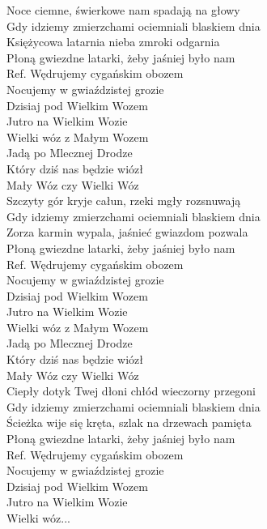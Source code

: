 
Noce ciemne, świerkowe nam spadają na głowy \\
Gdy idziemy zmierzchami ociemniali blaskiem dnia \\
Księżycowa latarnia nieba zmroki odgarnia  \tab{}\\
Płoną gwiezdne latarki, żeby jaśniej było nam  \tab{}\\
\hops
Ref. Wędrujemy cygańskim obozem \tab{}\\
 Nocujemy w gwiaździstej grozie  \tab{}\\
 Dzisiaj pod Wielkim Wozem  \tab{}\\
 Jutro na Wielkim Wozie  \tab{}\tab{}\\
\hops
{} {} Wielki wóz z Małym Wozem  \tab{}\\
 {} Jadą po Mlecznej Drodze  \tab{}\\
 {} Który dziś nas będzie wiózł  \tab{}\\
 {} Mały Wóz czy Wielki Wóz  \tab{}\\
\hops
Szczyty gór kryje całun, rzeki mgły rozsnuwają \\
Gdy idziemy zmierzchami ociemniali blaskiem dnia \\
Zorza karmin wypala, jaśnieć gwiazdom pozwala \\
Płoną gwiezdne latarki, żeby jaśniej było nam \\
\hops
Ref. Wędrujemy cygańskim obozem\\
 Nocujemy w gwiaździstej grozie \\
 Dzisiaj pod Wielkim Wozem \\
 Jutro na Wielkim Wozie \\
\hops
{} {} Wielki wóz z Małym Wozem \\
 {} Jadą po Mlecznej Drodze \\
 {} Który dziś nas będzie wiózł \\
 {} Mały Wóz czy Wielki Wóz \\
\hops
Ciepły dotyk Twej dłoni chłód wieczorny przegoni \\
Gdy idziemy zmierzchami ociemniali blaskiem dnia \\
Ścieżka wije się kręta, szlak na drzewach pamięta \\
Płoną gwiezdne latarki, żeby jaśniej było nam \\
\hops
Ref. Wędrujemy cygańskim obozem\\
 Nocujemy w gwiaździstej grozie \\
 Dzisiaj pod Wielkim Wozem \\
 Jutro na Wielkim Wozie \\
\hops
{} {} Wielki wóz...
